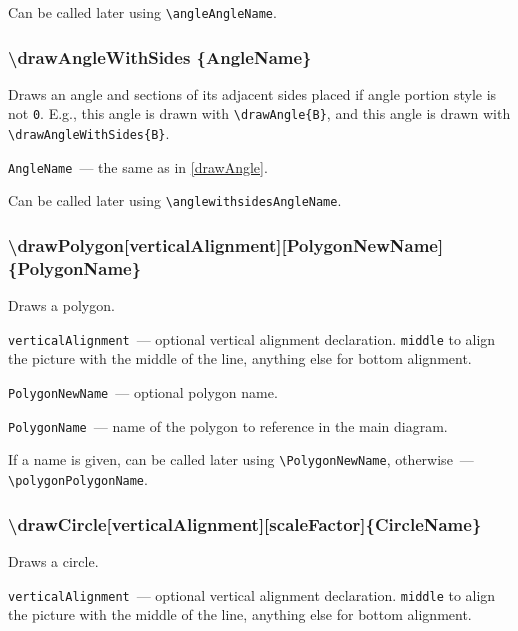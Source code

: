 	Can be called later using \texttt{\textbackslash angleAngleName}.
	
\subsubsection{\textbackslash drawAngleWithSides \{AngleName\}}


	Draws an angle and sections of its adjacent sides placed if angle portion style is not \texttt{0}. E.g., this angle  is drawn with \texttt{\textbackslash drawAngle\{B\}}, and this angle  is drawn with \texttt{\textbackslash drawAngleWithSides\{B\}}. 

	\texttt{AngleName}~— the same as in \ref{drawAngle}.
	
	Can be called later using \texttt{\textbackslash anglewithsidesAngleName}.
	
\subsubsection{\textbackslash drawPolygon[verticalAlignment][PolygonNewName]\{PolygonName\}}

	Draws a polygon.

	\texttt{verticalAlignment}~— optional vertical alignment declaration. \texttt{middle} to align the picture with the middle of the line, anything else for bottom alignment.

	\texttt{PolygonNewName}~— optional polygon name. 
	
	\texttt{PolygonName}~— name of the polygon to reference in the main diagram. 
	
	If a name is given, can be called later using \texttt{\textbackslash PolygonNewName}, otherwise~— \texttt{\textbackslash polygonPolygonName}. 
	
\subsubsection{\textbackslash drawCircle[verticalAlignment][scaleFactor]\{CircleName\}}

	Draws a circle.

	\texttt{verticalAlignment}~— optional vertical alignment declaration. \texttt{middle} to align the picture with the middle of the line, anything else for bottom alignment.
	
